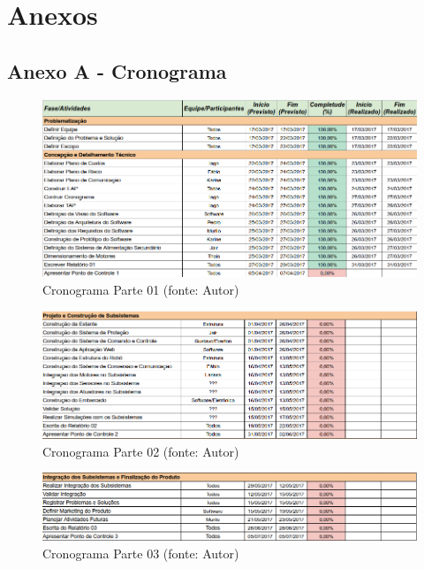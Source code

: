 \chapter[Anexos]{Anexos}
\section{Anexo A - Cronograma}

\begin{figure}[!h]
\centering
\includegraphics[scale=0.65, angle = 360]{figuras/cronograma1}
\caption[]{Cronograma Parte 01 (fonte: Autor)}
\end{figure}
\FloatBarrier

\begin{figure}[!h]
\centering
\includegraphics[scale=0.65, angle = 360]{figuras/cronograma2}
\caption[]{Cronograma Parte 02 (fonte: Autor)}
\end{figure}
\FloatBarrier

\begin{figure}[!h]
\centering
\includegraphics[scale=0.65, angle = 360]{figuras/cronograma3}
\caption[]{Cronograma Parte 03 (fonte: Autor)}
\end{figure}
\FloatBarrier